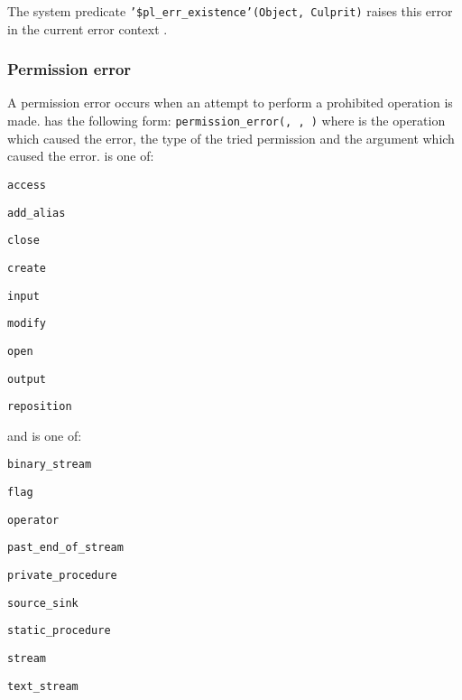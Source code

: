 The system predicate \texttt{'\$pl\_err\_existence'(Object, Culprit)} raises
this error in the current error context .

\subsubsection{Permission error}
\label{Permission-error}
A permission error occurs when an attempt to perform a prohibited operation
is made.  has the following form:
\texttt{permission\_error(, ,
)} where  is the operation which
caused the error,  the type of the tried
permission and  the argument which caused the
error.  is one of:

\begin{ItemizeThreeCols}

\item \texttt{access}

\item \texttt{add\_alias}

\item \texttt{close}

\item \texttt{create}

\item \texttt{input}

\item \texttt{modify}

\item \texttt{open}

\item \texttt{output}

\item \texttt{reposition}

\end{ItemizeThreeCols}

and  is one of:

\begin{ItemizeThreeCols}

\item \texttt{binary\_stream}

\item \texttt{flag}

\item \texttt{operator}

\item \texttt{past\_end\_of\_stream}

\item \texttt{private\_procedure}

\item \texttt{source\_sink}

\item \texttt{static\_procedure}

\item \texttt{stream}

\item \texttt{text\_stream}

\end{ItemizeThreeCols}

